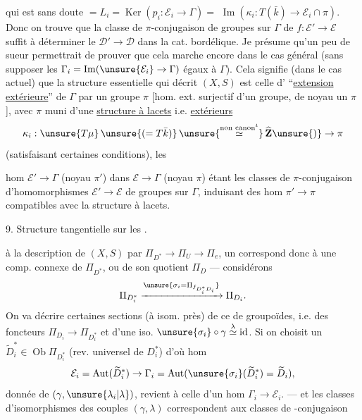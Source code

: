 
qui est sans doute $=L_i=\operatorname{Ker}(p_i:\mathcal{E}_i\to\Gamma)=$ \uline{$\operatorname{Im}$}$(\kappa_i:T(\bar{k})\to\mathcal{E}_i\cap\pi)$.
Donc on trouve que  la classe de  $\pi$-conjugaison de groupes sur $\Gamma$ de $f:\mathcal{E}'\to\mathcal{E}$ suffit à déterminer le  $\mathcal{D}'\to\mathcal{D}$ dans la cat. bordélique.
Je présume qu'un peu de sueur permettrait de prouver que cela marche encore dans le cas général (sans supposer les $\Gamma_i=\operatorname{Im}(\unsure{\mathcal{E}_i}\to\Gamma)$ égaux à $\Gamma$).
Cela signifie (dans le cas actuel) que la structure essentielle qui décrit $(X,S)$ est celle d' ``\uline{extension extérieure}'' de $\Gamma$ par un groupe $\pi$ [hom. ext. surjectif d'un groupe, de noyau un $\pi$], avec $\pi$ muni d'une \uline{structure à lacets} i.e.   \uline{extérieurs}
\[
\kappa_i:\unsure{T\mu}\,\unsure{(=T\bar{k})}\,\unsure{\overset{\text{non canon}^{t}}{\simeq}}\,\widehat{\mathbf{Z}}\unsure{)}\to\pi
\]
(satisfaisant certaines conditions), les



hom  $\mathcal{E}'\to\Gamma$ (noyau $\pi'$) dans $\mathcal{E}\to\Gamma$ (noyau $\pi$) étant les classes de $\pi$-conjugaison d'homomorphismes $\mathcal{E}'\to\mathcal{E}$ de groupes sur $\Gamma$, induisant des hom $\pi'\to\pi$ compatibles avec la structure à lacets.

9. Structure tangentielle  sur les .

 à la description de $(X,S)$ par
$\Pi_{D^*}\to\Pi_U\to\Pi_e$, un  correspond donc à une comp. connexe  de $\Pi_{D^*}$, ou  de son quotient $\Pi_D$ --- considérons
\[
\Pi_{D_i^*}\xrightarrow{\unsure{\sigma_i=\Pi_{f_{D_i^*D_i}}}}\Pi_{D_i}.
\]
On va décrire certaines sections (à isom. près) de ce   de groupoïdes, i.e. des  foncteurs
$\Pi_{D_i}\to\Pi_{D_i^*}$ et d'une iso. $\unsure{\sigma_i}\circ\gamma\overset{\lambda}{\simeq}\operatorname{id}$.
Si on choisit un $\widetilde{D}_i^*\in\operatorname{Ob}\Pi_{D_i^*}$ (rev. universel de $D_i^*$) d'où hom 
\[
\mathcal{E}_i=\operatorname{Aut}(\widetilde{D}_i^*)\to\Gamma_i
=\operatorname{Aut}(\unsure{\sigma_i}(\widetilde{D}_i^*)=\widetilde{D}_i),
\]
  donnée de $(\gamma,\unsure{\lambda_i|\lambda})$,  revient à celle d'un hom $\Gamma_i\to\mathcal{E}_i$.
--- et les classes d'isomorphismes des couples $(\gamma,\lambda)$ correspondent aux classes de -conjugaison

